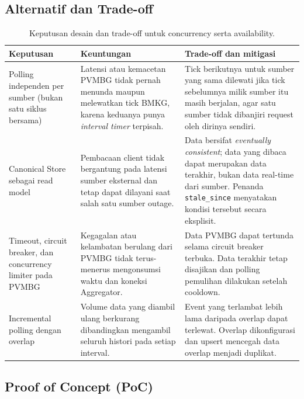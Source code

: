 \subsection{Alternatif dan Trade-off}
\begin{table}[H]
  \centering
  \small
  \begin{tabularx}{\textwidth}{p{3.1cm}XX}
    \toprule
    Keputusan & Keuntungan & Trade-off dan mitigasi \\
    \midrule
    Polling independen per sumber (bukan satu siklus bersama) &
    Latensi atau kemacetan PVMBG tidak pernah menunda maupun melewatkan tick
    BMKG, karena keduanya punya \textit{interval timer} terpisah. &
    Tick berikutnya untuk sumber yang sama dilewati jika tick sebelumnya milik
    sumber itu masih berjalan, agar satu sumber tidak dibanjiri request oleh
    dirinya sendiri. \\
    \addlinespace
    Canonical Store sebagai read model &
    Pembacaan client tidak bergantung pada latensi sumber eksternal dan tetap
    dapat dilayani saat salah satu sumber outage. &
    Data bersifat \textit{eventually consistent}; data yang dibaca dapat
    merupakan data terakhir, bukan data real-time dari sumber. Penanda
    \texttt{stale\_since} menyatakan kondisi tersebut secara eksplisit. \\
    \addlinespace
    Timeout, circuit breaker, dan concurrency limiter pada PVMBG &
    Kegagalan atau kelambatan berulang dari PVMBG tidak terus-menerus
    mengonsumsi waktu dan koneksi Aggregator. &
    Data PVMBG dapat tertunda selama circuit breaker terbuka. Data terakhir
    tetap disajikan dan polling pemulihan dilakukan setelah cooldown. \\
    \addlinespace
    Incremental polling dengan overlap &
    Volume data yang diambil ulang berkurang dibandingkan mengambil seluruh
    histori pada setiap interval. &
    Event yang terlambat lebih lama daripada overlap dapat terlewat. Overlap
    dikonfigurasi dan upsert mencegah data overlap menjadi duplikat. \\
    \bottomrule
  \end{tabularx}
  \caption{Keputusan desain dan trade-off untuk concurrency serta availability.}
  \label{tab:problem-dua-tradeoff}
\end{table}

\subsection{Proof of Concept (PoC)}

